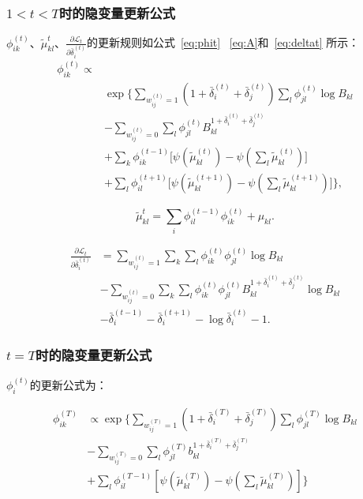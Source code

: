\subsubsection{$1<t<T$时的隐变量更新公式}
$\phi_{ik}^{(t)}、\tilde{\mu}_{kl}^t、\frac{\partial \mathscr{L}_t}{\partial \bar{\delta}_i^{(t)}}$的更新规则如公式~\ref{eq:phit} ~\ref{eq:A}和~\ref{eq:deltat} 所示：
   \begin{equation}
   \begin{split}
   \phi_{ik}^{(t)} \propto \\
   &\exp\bigg\{ \sum_{w_{ij}^{(t)}=1} (1+\bar{\delta}_i^{(t)}+\bar{\delta}_j^{(t)}) \sum_l \phi_{jl}^{(t)} \log B_{kl} \\
   & -\sum_{w_{ij}^{(t)}=0} \sum_l \phi_{jl}^{(t)}  B_{kl}^{1+\bar{\delta}_i^{(t)}+\bar{\delta}_j^{(t)}}  \\
  & +\sum_k \phi_{ik}^{(t-1)} \Big[\psi(\tilde{\mu}_{kl}^{(t)}) - \psi(\sum_l \tilde{\mu}_{kl}^{(t)})\Big] \\
   &+ \sum_l \phi_{il}^{(t+1)} \Big[\psi(\tilde{\mu}_{kl}^{(t+1)}) - \psi(\sum_l \tilde{\mu}_{kl}^{(t+1)})\Big] \bigg\},
   \label{eq:phit}
   \end{split}
   \end{equation}

   \begin{equation}
   \tilde{\mu}_{kl}^t = \sum_i \phi_{il}^{(t-1)} \phi_{ik}^{(t)} + \mu_{kl}.
   \label{eq:A}
   \end{equation}


\begin{align}
\frac{\partial \mathscr{L}_t}{\partial \bar{\delta}_i^{(t)}} & =\sum_{w_{ij}^{(t)}=1} \sum_k \sum_l \phi_{ik}^{(t)}\phi_{jl}^{(t)} \log B_{kl}  \nonumber\\
& -\sum_{w_{ij}^{(t)}=0} \sum_k \sum_l \phi_{ik}^{(t)}\phi_{jl}^{(t)}  B_{kl}^{1+\bar{\delta}_i^{(t)}+\bar{\delta}_j^{(t)}} \log B_{kl} \nonumber\\
& -\bar{\delta}_i^{(t-1)} - \bar{\delta}_i^{(t+1)} - \log \bar{\delta}_i^{(t)} - 1.
\label{eq:deltat}
\end{align}



\subsubsection{$t=T$时的隐变量更新公式}

$\phi_i^{(t)}$的更新公式为：


\begin{equation}
\begin{split}
\phi_{ik}^{(T)} & \propto \exp\{ \sum_{w_{ij}^{(T)}=1} (1+\bar{\delta}_i^{(T)}+\bar{\delta}_j^{(T)}) \sum_l \phi_{jl}^{(T)} \log B_{kl} \\
& -\sum_{w_{ij}^{(T)}=0} \sum_l \phi_{jl}^{(T)}  b_{kl}^{1+\bar{\delta}_i^{(T)}+\bar{\delta}_j^{(T)}}  \\
& + \sum_l \phi_{il}^{(T-1)} [\psi(\tilde{\mu}_{kl}^{(T)}) - \psi(\sum_l \tilde{\mu}_{kl}^{(T)})] \}
\end{split}
\label{eq:phiT}
\end{equation}

